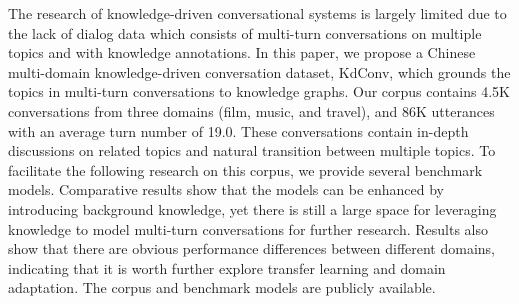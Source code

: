 The research of knowledge-driven conversational systems is largely limited due to the lack of dialog data which consists of multi-turn conversations on multiple topics and with knowledge annotations. In this paper, we propose a Chinese multi-domain knowledge-driven conversation dataset, KdConv, which grounds the topics in multi-turn conversations to knowledge graphs. Our corpus contains 4.5K conversations from three domains (film, music, and travel), and 86K utterances with an average turn number of 19.0. These conversations contain in-depth discussions on related topics and natural transition between multiple topics. To facilitate the following research on this corpus, we provide several benchmark models. Comparative results show that the models can be enhanced by introducing background knowledge, yet there is still a large space for leveraging knowledge to model multi-turn conversations for further research. Results also show that there are obvious performance differences between different domains, indicating that it is worth further explore transfer learning and domain adaptation. The corpus and benchmark models are publicly available.
